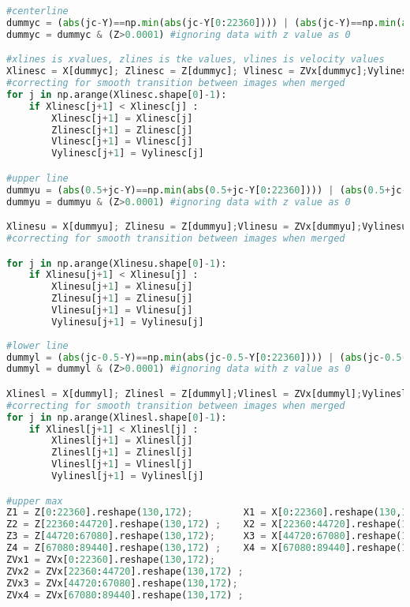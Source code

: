 \begin{lstlisting}[language=Python]
#centerline
dummyc = (abs(jc-Y)==np.min(abs(jc-Y[0:22360]))) | (abs(jc-Y)==np.min(abs(jc-Y[22360:44720]))) | (abs(jc-Y)==np.min(abs(jc-Y[44720:67080]))) | (abs(jc-Y)==np.min(abs(jc-Y[67080:89438])))
dummyc = dummyc & (Z>0.0001) #ignoring data with z value as 0

#xlines is xvalues, zlines is tke values, vlines is velocity values
Xlinesc = X[dummyc]; Zlinesc = Z[dummyc]; Vlinesc = ZVx[dummyc];Vylinesc = ZVy[dummyc]
#correcting for smooth transition between images when merged
for j in np.arange(Xlinesc.shape[0]-1):
    if Xlinesc[j+1] < Xlinesc[j] :
        Xlinesc[j+1] = Xlinesc[j]
        Zlinesc[j+1] = Zlinesc[j]
        Vlinesc[j+1] = Vlinesc[j]
        Vylinesc[j+1] = Vylinesc[j]

#upper line
dummyu = (abs(0.5+jc-Y)==np.min(abs(0.5+jc-Y[0:22360]))) | (abs(0.5+jc-Y)==np.min(abs(0.5+jc-Y[22360:44720]))) | (abs(0.5+jc-Y)==np.min(abs(0.5+jc-Y[44720:67080]))) | (abs(0.5+jc-Y)==np.min(abs(0.5+jc-Y[67080:89438])))
dummyu = dummyu & (Z>0.0001) #ignoring data with z value as 0

Xlinesu = X[dummyu]; Zlinesu = Z[dummyu];Vlinesu = ZVx[dummyu];Vylinesu = ZVy[dummyu]
#correcting for smooth transition between images when merged

for j in np.arange(Xlinesu.shape[0]-1):
    if Xlinesu[j+1] < Xlinesu[j] :
        Xlinesu[j+1] = Xlinesu[j]
        Zlinesu[j+1] = Zlinesu[j]
        Vlinesu[j+1] = Vlinesu[j]
        Vylinesu[j+1] = Vylinesu[j]
     
#lower line
dummyl = (abs(jc-0.5-Y)==np.min(abs(jc-0.5-Y[0:22360]))) | (abs(jc-0.5-Y)==np.min(abs(jc-0.5-Y[22360:44720]))) | (abs(jc-0.5-Y)==np.min(abs(jc-0.5-Y[44720:67080]))) | (abs(jc-0.5-Y)==np.min(abs(jc-0.5-Y[67080:89438])))
dummyl = dummyl & (Z>0.0001) #ignoring data with z value as 0

Xlinesl = X[dummyl]; Zlinesl = Z[dummyl];Vlinesl = ZVx[dummyl];Vylinesl = ZVy[dummyl]
#correcting for smooth transition between images when merged
for j in np.arange(Xlinesl.shape[0]-1):
    if Xlinesl[j+1] < Xlinesl[j] :
        Xlinesl[j+1] = Xlinesl[j]
        Zlinesl[j+1] = Zlinesl[j]  
        Vlinesl[j+1] = Vlinesl[j]
        Vylinesl[j+1] = Vylinesl[j]

#upper max
Z1 = Z[0:22360].reshape(130,172);         X1 = X[0:22360].reshape(130,172);
Z2 = Z[22360:44720].reshape(130,172) ;    X2 = X[22360:44720].reshape(130,172) ;
Z3 = Z[44720:67080].reshape(130,172);     X3 = X[44720:67080].reshape(130,172); 
Z4 = Z[67080:89440].reshape(130,172) ;    X4 = X[67080:89440].reshape(130,172) ;
ZVx1 = ZVx[0:22360].reshape(130,172);         
ZVx2 = ZVx[22360:44720].reshape(130,172) ;    
ZVx3 = ZVx[44720:67080].reshape(130,172);     
ZVx4 = ZVx[67080:89440].reshape(130,172) ;   
  

\end{lstlisting}
